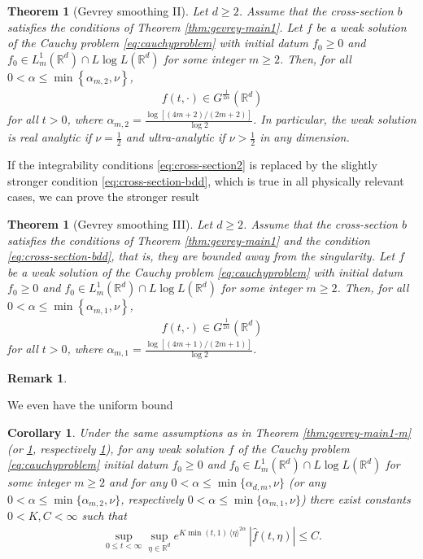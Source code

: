 \documentclass[11pt,a4paper,reqno]{amsart}
\theoremstyle{plain}
\newtheorem{corollary}[proposition]{Corollary}
\newtheorem{theorem}[proposition]{Theorem}
\theoremstyle{definition}
\newtheorem{remark}[proposition]{Remark}
\begin{document}
\begin{theorem}[Gevrey smoothing II]\label{thm:gevrey-main2-m}
	Let $d\ge 2$. Assume that the cross-section $b$ satisfies the conditions of Theorem \ref{thm:gevrey-main1}. Let $f$ be a weak solution of the Cauchy problem \eqref{eq:cauchyproblem} with initial datum $f_0\ge 0$ and $f_0\in L^1_m({\mathbb{R}}^d)\cap L\log L({\mathbb{R}}^d)$ for some integer $m\ge 2$. Then, for all $0<\alpha\leq \min\left\{\alpha_{m,2}, \nu\right\}$,
	\begin{align}
		f(t,\cdot)\in G^{\tfrac{1}{2\alpha}}({\mathbb{R}}^d)
	\end{align}
	for all $t>0$, where $\alpha_{m,2} = \frac{\log[(4m+2)/(2m+2)]}{\log 2}$. In particular, the weak solution is real analytic if $\nu=\frac{1}{2}$ and ultra-analytic if $\nu>\frac{1}{2}$ in \emph{any dimension}.
\end{theorem}

If the integrability conditions \eqref{eq:cross-section2} is replaced by the slightly stronger condition \eqref{eq:cross-section-bdd}, which is true in all physically relevant cases, we can prove the  stronger result

\begin{theorem}[Gevrey smoothing III]\label{thm:gevrey-main3-m}
	Let $d\ge 2$. Assume that the cross-section $b$ satisfies the conditions of Theorem \ref{thm:gevrey-main1} and the condition \eqref{eq:cross-section-bdd},  that is, they are bounded away from the singularity.  Let $f$ be a weak solution of the Cauchy problem \eqref{eq:cauchyproblem} with initial datum $f_0\ge 0$ and $f_0\in L^1_m({\mathbb{R}}^d)\cap L\log L({\mathbb{R}}^d)$ for some integer $m\ge 2$. Then, for all $0<\alpha\leq \min\left\{\alpha_{m,1}, \nu\right\}$,
	\begin{align}
		f(t,\cdot)\in G^{\tfrac{1}{2\alpha}}({\mathbb{R}}^d)
	\end{align}
	for all $t>0$, where $\alpha_{m,1} = \frac{\log[(4m+1)/(2m+1)]}{\log 2}$.
\end{theorem}

\begin{remark}
		
\end{remark}

We even have the uniform bound
\begin{corollary}\label{cor:gevrey-m}
	Under the same assumptions as in Theorem \ref{thm:gevrey-main1-m} (or \ref{thm:gevrey-main2-m}, respectively \ref{thm:gevrey-main3-m}), for any weak solution $f$ of the Cauchy problem \eqref{eq:cauchyproblem}
	initial datum $f_0\ge 0$ and $f_0\in L^1_m({\mathbb{R}}^d)\cap L\log L({\mathbb{R}}^d)$ for some integer $m\ge 2$
	and for any $0<\alpha\leq \min\{\alpha_{d,m}, \nu\}$ (or any $0<\alpha\leq \min\{\alpha_{m,2}, \nu\}$, respectively $0<\alpha\leq \min\{\alpha_{m,1}, \nu\}$) there exist constants $0<K,C<\infty$ such that
	\begin{align}\label{eq:Fourier-uniform}
		\sup_{0\le t<\infty}\sup_{\eta\in{\mathbb{R}}^d}
		e^{K \min(t,1) \, \langle \eta \rangle^{2\alpha}} \,|\hat{f}(t,\eta)|
		\leq C .
	\end{align}
\end{corollary}
\end{document}
